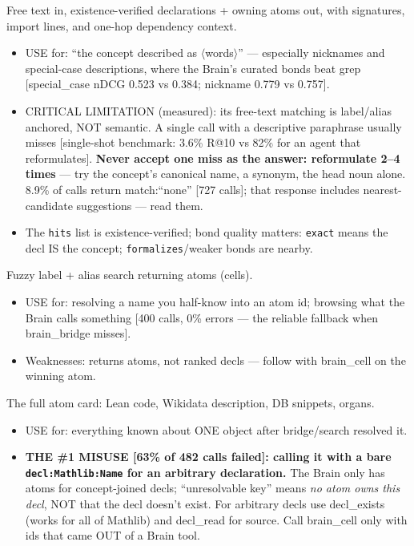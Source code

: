 \documentclass[10pt]{article}
\newcommand{\code}[1]{\texttt{#1}}
\begin{document}

Free text in, existence-verified declarations + owning atoms out, with
signatures, import lines, and one-hop dependency context.
\begin{itemize}
\item USE for: ``the concept described as $\langle$words$\rangle$'' ---
  especially nicknames and special-case descriptions, where the Brain's
  curated bonds beat grep [special\_case nDCG 0.523 vs 0.384; nickname
  0.779 vs 0.757].
\item CRITICAL LIMITATION (measured): its free-text matching is
  label/alias anchored, NOT semantic. A single call with a descriptive
  paraphrase usually misses [single-shot benchmark: 3.6\% R@10 vs 82\%
  for an agent that reformulates]. \textbf{Never accept one miss as the
  answer: reformulate 2--4 times} --- try the concept's canonical name,
  a synonym, the head noun alone. 8.9\% of calls return match:``none''
  [727 calls]; that response includes nearest-candidate suggestions ---
  read them.
\item The \code{hits} list is existence-verified; bond quality matters:
  \code{exact} means the decl IS the concept;
  \code{formalizes}/weaker bonds are nearby.
\end{itemize}

Fuzzy label + alias search returning atoms (cells).
\begin{itemize}
\item USE for: resolving a name you half-know into an atom id; browsing
  what the Brain calls something [400 calls, 0\% errors --- the
  reliable fallback when brain\_bridge misses].
\item Weaknesses: returns atoms, not ranked decls --- follow with
  brain\_cell on the winning atom.
\end{itemize}

The full atom card: Lean code, Wikidata description, DB snippets,
organs.
\begin{itemize}
\item USE for: everything known about ONE object after bridge/search
  resolved it.
\item \textbf{THE \#1 MISUSE [63\% of 482 calls failed]: calling it
  with a bare \code{decl:Mathlib:Name} for an arbitrary declaration.}
  The Brain only has atoms for concept-joined decls; ``unresolvable
  key'' means \emph{no atom owns this decl}, NOT that the decl doesn't
  exist. For arbitrary decls use decl\_exists (works for all of
  Mathlib) and decl\_read for source. Call brain\_cell only with ids
  that came OUT of a Brain tool.
\end{itemize}
\end{document}
